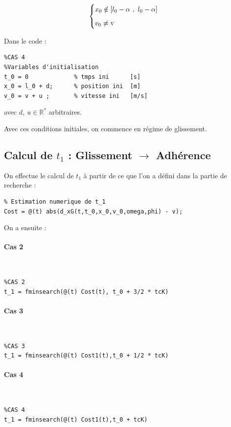 \documentclass{article}
\begin{document}
$$
\begin{cases}
	\vspace{.2cm}
	x_0 \notin [l_0-\alpha~,~l_0-\alpha]\\
	v_0\neq \text{v}
\end{cases}
$$

Dans le code :

\begin{lstlisting}
%CAS 4
%Variables d'initialisation
t_0 = 0				% tmps ini		[s]
x_0 = l_0 + d;		% position ini	[m]
v_0 = v + u ;		% vitesse ini	[m/s]       
\end{lstlisting}

avec $d,~u\in \mathbb{R}^*$ arbitraires.

Avec ces conditions initiales, on commence en régime de glissement.

\subsection{Calcul de $t_1$ : Glissement $\rightarrow$ Adhérence}
On effectue le calcul de $t_1$ à partir de ce que l'on a défini dans la partie de recherche :

\begin{lstlisting}
% Estimation numerique de t_1
Cost = @(t) abs(d_xG(t,t_0,x_0,v_0,omega,phi) - v);
\end{lstlisting}

On a ensuite :
\paragraph{Cas 2}
$ $
\begin{lstlisting}
%CAS 2
t_1 = fminsearch(@(t) Cost(t), t_0 + 3/2 * tcK)		
\end{lstlisting}

\paragraph{Cas 3}
$ $
\begin{lstlisting}
%CAS 3
t_1 = fminsearch(@(t) Cost1(t),t_0 + 1/2 * tcK)		
\end{lstlisting}

\paragraph{Cas 4}
$ $
\begin{lstlisting}
%CAS 4
t_1 = fminsearch(@(t) Cost1(t),t_0 + tcK)		
\end{lstlisting}
\end{document}
